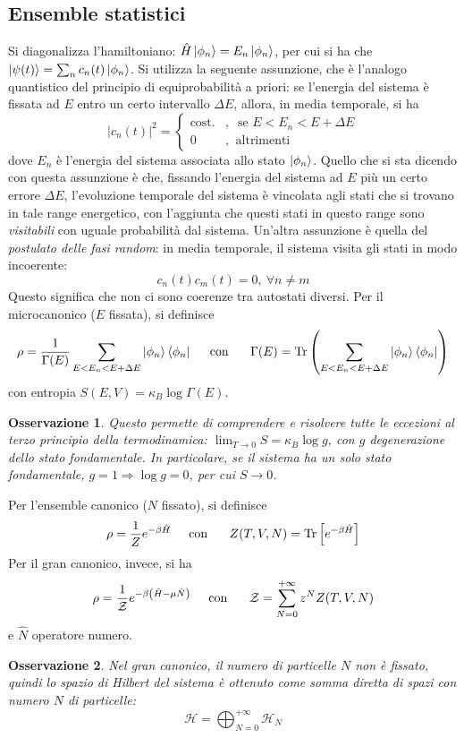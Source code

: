 \documentclass[11pt, a4paper]{scrartcl}
\theoremstyle{style}
\newtheorem{osservazione}{Osservazione}[section]
\theoremstyle{style1}
\numberwithin{equation}{subsection}
\begin{document}
\subsection{Ensemble statistici}
Si diagonalizza l'hamiltoniano: $\hat{H } \ket{\phi _n}  = E_n \ket{\phi _n} $, per cui si ha che $\ket{\psi (t)} = \sum_{n}^{} c_n(t) \ket{\phi _n} $.
Si utilizza la seguente assunzione, che \`e l'analogo quantistico del principio di equiprobabilit\`a a priori: se l'energia del sistema \`e fissata ad $E$ entro un certo intervallo $\Delta E$, allora, in media temporale, si ha
\[
\lvert c_n(t) \rvert ^2 = \begin{cases}
	\text{cost.}&,\ \text{ se } E < E_n < E+\Delta E\\
	0 &,\ \text{ altrimenti }
\end{cases}
\] 
dove $E_n$ \`e l'energia del sistema associata allo stato $\ket{\phi _n} $.
Quello che si sta dicendo con questa assunzione \`e che, fissando l'energia del sistema ad $E$ pi\`u un certo errore $\Delta E$, l'evoluzione temporale del sistema \`e vincolata agli stati che si trovano in tale range energetico, con l'aggiunta che questi stati in questo range sono \textit{visitabili} con uguale probabilit\`a dal sistema.
Un'altra assunzione \`e quella del \textit{postulato delle fasi random}: in media temporale, il sistema visita gli stati in modo incoerente:
\[
c_n(t) c_m(t) = 0, \ \forall n\neq m
\] 
Questo significa che non ci sono coerenze tra autostati diversi.
Per il microcanonico ($E$ fissata), si definisce 
\[
\rho  = \frac{1}{\Gamma(E)} \sum_{E<E_n< E+\Delta E}^{} \ket{\phi _n} \bra{\phi _n} \hspace{.5cm} \text{con }\hspace{.5cm} \Gamma(E) = \operatorname{Tr} \left(\sum_{E<E_n<E+\Delta E}^{} \ket{\phi _n} \bra{\phi _n} \right)  
\] 
con entropia $S(E,V) = \kappa _B \log\Gamma(E)$.
\begin{osservazione}
Questo permette di comprendere e risolvere tutte le eccezioni al terzo principio della termodinamica: $\displaystyle \lim_{T \to 0} S = \kappa _B \log g$, con $g$ degenerazione dello stato fondamentale. In particolare, se il sistema ha un solo stato fondamentale, $g=1\Rightarrow \log g = 0$, per cui $S \to  0$.
\end{osservazione}
\noindent Per l'ensemble canonico ($N$ fissato), si definisce 
\[
 	\rho = \frac{1}{Z} e^{-\beta \hat{H}}\hspace{.5cm} \text{con }\hspace{.5cm} Z(T,V,N) = \operatorname{Tr} \left[ e^{-\beta \hat{H}} \right] 
\] 
Per il gran canonico, invece, si ha 
\[
\rho  = \frac{1}{\mathcal{Z} } e^{-\beta \left(\hat{H}- \mu  \hat{N}\right) }\hspace{.5cm} \text{con }\hspace{.5cm} \mathcal{Z} =\sum_{N=0}^{+\infty} z^N Z(T,V,N)
\] 
e $\hat{N}$ operatore numero.
\begin{osservazione}
Nel gran canonico, il numero di particelle $N$ non \`e fissato, quindi lo spazio di Hilbert del sistema \`e ottenuto come somma diretta di spazi con numero $N$ di particelle: 
\[
\mathcal{H} = \bigoplus_{N=0} ^{+\infty} \mathcal{H} _N
\] 
\end{osservazione}
\end{document}
